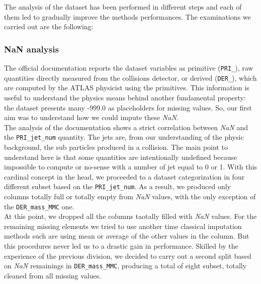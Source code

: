 \documentclass[10pt,article]{IEEEtran}
\begin{document}

The analysis of the dataset has been performed in different steps and each of them led to gradually improve the methods performances. The examinations we carried out are the following:
\subsubsection{NaN analysis} The official documentation \cite{higghsdoc} reports the dataset variables as primitive (\texttt{PRI\_}), raw quantities directly measured from the collisions detector, or derived (\texttt{DER\_}), which are computed by the ATLAS physicist using the primitives. This information is useful to understand the physics means behind another fundamental property: the dataset presents many -999.0 as placeholders for missing values. So, our first aim was to understand how we could impute these \textit{NaN}.\\
The analysis of the documentation shows a strict correlation between \textit{NaN} and the \texttt{PRI\_jet\_num} quantity. The jets are, from our understanding of the physic background, the sub particles produced in a collision. The main point to understand here is that some quantities are intentionally undefined because impossible to compute or no-sense with a number of jet equal to 0 or 1. With this cardinal concept in the head, we proceeded to a dataset categorization in four different subset based on the \texttt{PRI\_jet\_num}. As a result, we produced only columns totally full or totally empty from \textit{NaN} values, with the only exception of the \texttt{DER\_mass\_MMC} one.\\
At this point, we dropped all the columns taotally filled with \textit{NaN} values. For the remaining missing elements we tried to use another time classical imputation methods such are using mean or average of the other values in the column. But this procedures never led us to a drastic gain in performance. Skilled by the experience of the previous division, we decided to carry out a second split based on \textit{NaN} remainings in \texttt{DER\_mass\_MMC}, producing a total of eight subset, totally cleaned from all missing values.
\end{document}
